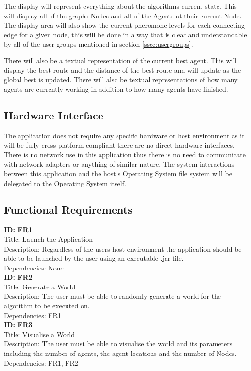 The display will represent everything about the algorithms current state. This will display all of the graphs Nodes and all of the Agents at their current Node. The display area will also show the current pheromone levels for each connecting edge for a given node, this will be done in a way that is clear and understandable by all of the user groups mentioned in section \ref{ssec:usergroups}.

There will also be a textual representation of the current best agent. This will display the best route and the distance of the best route and will update as the global best is updated. There will also be textual representations of how many agents are currently working in addition to how many agents have finished.

\subsection{Hardware Interface}

The application does not require any specific hardware or host environment as it will be fully cross-platform compliant there are no direct hardware interfaces. There is no network use in this application thus there is no need to communicate with network adapters or anything of similar nature. The system interactions between this application and the host's Operating System file system will be delegated to the Operating System itself.

\subsection{Functional Requirements}
\label{funcreq}
\textbf{ID: FR1}\\
Title: Launch the Application\\
Description: Regardless of the users host environment the application should be able to be launched by the user using an executable .jar file.\\
Dependencies: None
\\

\noindent
\textbf{ID: FR2}\\
Title: Generate a World\\
Description: The user must be able to randomly generate a world for the algorithm to be executed on.\\
Dependencies: FR1
\\

\noindent
\textbf{ID: FR3}\\
Title: Visualise a World\\
Description: The user must be able to visualise the world and its parameters including the number of agents, the agent locations and the number of Nodes.\\
Dependencies: FR1, FR2
\\

